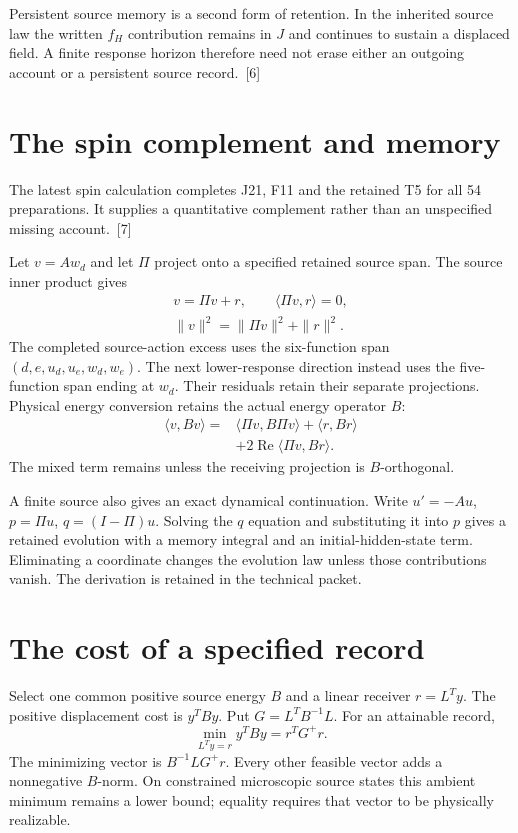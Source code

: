 \documentclass[10pt,twocolumn,letterpaper]{article}
\begin{document}
Persistent source memory is a second form of retention. In the inherited source law the written $f_H$ contribution remains in $J$ and continues to sustain a displaced field. A finite response horizon therefore need not erase either an outgoing account or a persistent source record.~[6]

\section{The spin complement and memory}
The latest spin calculation completes J21, F11 and the retained T5 for all 54 preparations. It supplies a quantitative complement rather than an unspecified missing account.~[7]

Let $v=Aw_d$ and let $\Pi$ project onto a specified retained source span. The source inner product gives
\[
\begin{gathered}
v=\Pi v+r,\qquad \langle\Pi v,r\rangle=0,\\
\|v\|^2=\|\Pi v\|^2+\|r\|^2.
\end{gathered}
\]
The completed source-action excess uses the six-function span $(d,e,u_d,u_e,w_d,w_e)$. The next lower-response direction instead uses the five-function span ending at $w_d$. Their residuals retain their separate projections. Physical energy conversion retains the actual energy operator $B$:
\[
\begin{aligned}
\langle v,Bv\rangle={}&\langle\Pi v,B\Pi v\rangle+\langle r,Br\rangle\\
&+2\operatorname{Re}\langle\Pi v,Br\rangle.
\end{aligned}
\]
The mixed term remains unless the receiving projection is $B$-orthogonal.

A finite source also gives an exact dynamical continuation. Write $u'=-Au$, $p=\Pi u$, $q=(I-\Pi)u$. Solving the $q$ equation and substituting it into $p$ gives a retained evolution with a memory integral and an initial-hidden-state term. Eliminating a coordinate changes the evolution law unless those contributions vanish. The derivation is retained in the technical packet.

\section{The cost of a specified record}
Select one common positive source energy $B$ and a linear receiver $r=L^Ty$. The positive displacement cost is $y^TBy$. Put $G=L^TB^{-1}L$. For an attainable record,
\[
\min_{L^Ty=r}y^TBy=r^TG^+r.
\]
The minimizing vector is $B^{-1}LG^+r$. Every other feasible vector adds a nonnegative $B$-norm. On constrained microscopic source states this ambient minimum remains a lower bound; equality requires that vector to be physically realizable.
\end{document}
